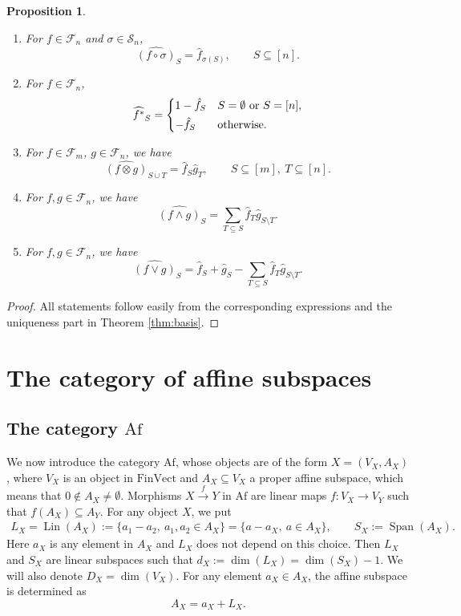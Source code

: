 \documentclass[12pt]{article}
\newtheorem{prop}{Proposition}
\theoremstyle{definition}
\theoremstyle{remark}
\def\lin{\operatorname{Lin}}
\def\Span{\operatorname{Span}}
\def\Fe{\mathcal F}
\def\permut{\mathscr{S}}
\def \Af{\mathrm{Af}}
\def \FV{\mathrm{FinVect}}
\begin{document}
\begin{prop}\label{prop:mobius} 

\begin{enumerate}
\item[(i)] For $f\in \Fe_n$ and  $\sigma\in \permut_n$, 
\[
\widehat{(f\circ \sigma)}_S=\hat
f_{\sigma(S)}, \qquad S\subseteq [n].
\]
\item[(ii)] For $f\in \Fe_n$, 
\[
\widehat{f^*}_S=\begin{dcases} 1-\hat f_S & S=\emptyset\text{ or } S=[n],\\
-\hat f_S & \text{otherwise}.
\end{dcases}
\]
\item[(iii)] For $f\in \Fe_m$, $g\in \Fe_n$, we have 
\[
\widehat{(f\otimes g)}_{S\dot{\cup}T}=\hat f_S\hat g_T,\qquad S\subseteq [m],\ T\subseteq
[n].
\]
\item[(iv)] For $f,g\in \Fe_n$, we have
\[
\widehat{(f\wedge g)}_S=\sum_{T\subseteq S} \hat f_T\hat g_{S\setminus T}.
\]
\item[(v)] For $f,g\in \Fe_n$, we have
\[
\widehat{(f\vee g)}_S=\hat f_S+\hat g_S-\sum_{T\subseteq S} \hat f_T\hat g_{S\setminus T}.
\]

\end{enumerate}


\end{prop}

\begin{proof} All statements follow easily from the corresponding expressions and the uniqueness part in Theorem
\ref{thm:basis}. 


\end{proof}


\section{The category of affine subspaces}


\subsection{The category $\Af$}

We now introduce the category $\Af$, whose objects  are of the form $X=(V_X,A_X)$, where
$V_X$ is an object in $\FV$  and $A_X\subseteq V_X$ a proper affine subspace, which means
that $0\notin A_X\ne \emptyset$. Morphisms $X\xrightarrow{f} Y$ in $\Af$ are linear maps $f:V_X\to V_Y$  such that
$f(A_X)\subseteq A_Y$. For any object $X$, we put
\begin{align*}
L_X=\lin(A_X):=\{a_1-a_2,\ a_1,a_2\in A_X\}=\{a-a_X,\ a\in A_X\}, \qquad S_X:=\Span(A_X).
\end{align*}
Here $a_X$ is any element in $A_X$ and $L_X$ does not depend on this choice.
Then $L_X$ and $S_X$ are linear subspaces such that $d_X:=\dim(L_X)=\dim(S_X)-1$. We will
also denote $D_X=\dim(V_X)$. For
any element $a_X\in A_X$, the affine subspace is determined as
\[
A_X=a_X+L_X.
\]
\end{document}
